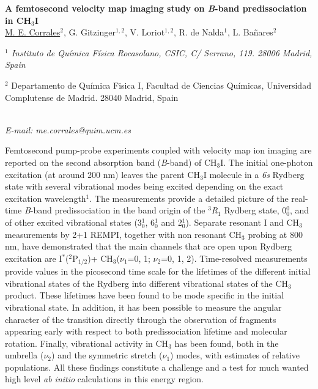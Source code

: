 \newpage
\setcounter{figure}{0}
\begin{center}
{\bf \Large
A femtosecond velocity map imaging study on \textit{B}-band predissociation in CH$_3$I
}
\\
\vspace{0.5cm}
\underline{M. E. Corrales}$^{2}$, G. Gitzinger$^{1,2}$, V. Loriot$^{1,2}$, R. de Nalda$^{1}$, L. Bañares$^{2}$
\\
\vspace{0.5cm}
{\it
$^{1}$ Instituto de Química Física Rocasolano, CSIC, C/ Serrano, 119. 28006 Madrid, Spain

$^{2}$ Departamento de Química Fisica I, Facultad de Ciencias Químicas, Universidad Complutense de
Madrid. 28040 Madrid, Spain
}
\\
\vspace{0.5cm}
{\it E-mail: me.corrales@quim.ucm.es}
\\
\vspace{0.5cm}
\end{center}
Femtosecond pump-probe experiments coupled with velocity map ion imaging are reported on the second absorption band (\textit{B}-band) of CH$_3$I. The initial one-photon excitation (at around 200 nm) leaves the parent CH$_3$I molecule in a \textit{6s} Rydberg state with several vibrational modes being excited depending on the exact excitation wavelength$^{1}$. The measurements provide a detailed picture of the real-time \textit{B}-band predissociation in the band origin of the $^{3}$\textit{R}$_{1}$ Rydberg state, 0$_{0}^{0}$, and of other excited vibrational states (3$_{0}^{1}$, 6$_{0}^{1}$ and 2$_{0}^{1}$). Separate resonant I and CH$_3$ measurements by 2+1 REMPI, together with non resonant CH$_3$ probing at 800 nm, have demonstrated that the main channels that are open upon Rydberg excitation are I$^{*}$($^{2}$P$_{1/2}$)+ CH$_3$($\nu _1$=0, 1; $\nu _2$=0, 1, 2). Time-resolved measurements provide values in the picosecond time scale for the lifetimes of the different initial vibrational states of the Rydberg into different vibrational states of the CH$_3$ product. These lifetimes have been found to be mode specific in the initial vibrational state. In addition, it has been possible to measure the angular character of the transition directly through the observation of fragments appearing early with respect to both predissociation lifetime and molecular rotation. Finally, vibrational activity in CH$_3$ has been found, both in the umbrella ($\nu _2$) and the symmetric stretch ($\nu _1$) modes, with estimates of relative populations. All these findings constitute a challenge and a test for much wanted high level \textit{ab initio} calculations in this energy region.
